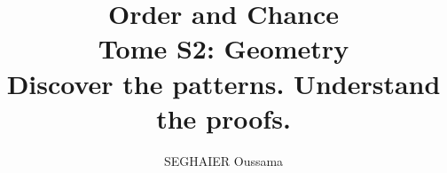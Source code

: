 \documentclass[11pt,openany]{book}
\title{\Huge\textbf{Order and Chance}\\[0.4em]\LARGE Tome S2: Geometry\\[0.6em]
\Large Discover the patterns. Understand the proofs.}
\author{SEGHAIER Oussama}
\date{\the\year}
\begin{document}
\frontmatter
\makecover
\maketitle

\tableofcontents

\mainmatter













\end{document}
